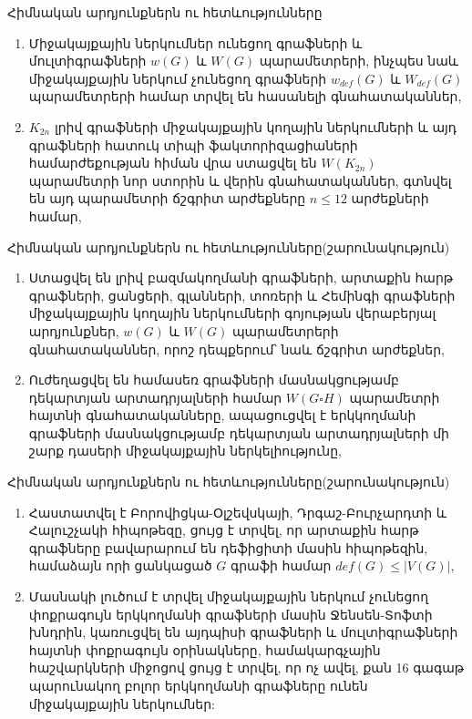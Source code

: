 \begin{frame}{Հիմնական արդյունքներն ու հետևությունները}
\begin{enumerate}
\justifying
    \item Միջակայքային ներկումներ ունեցող գրաֆների և մուլտիգրաֆների $w(G)$ և $W(G)$ պարամետրերի, ինչպես նաև միջակայքային ներկում չունեցող գրաֆների $w_{def}(G)$ և $W_{def}(G)$ պարամետրերի համար տրվել են հասանելի գնահատականներ,
    
    \item $K_{2n}$ լրիվ գրաֆների միջակայքային կողային ներկումների և այդ գրաֆների հատուկ տիպի ֆակտորիզացիաների համարժեքության հիման վրա ստացվել են  $W(K_{2n})$ պարամետրի նոր ստորին և վերին գնահատականներ, գտնվել են այդ պարամետրի ճշգրիտ արժեքները $n \leq 12$ արժեքների համար,
    \seti
\end{enumerate}
\end{frame}

\begin{frame}{Հիմնական արդյունքներն ու հետևությունները}{(շարունակություն)}
\begin{enumerate}
    \justifying
    \conti
    \item Ստացվել են լրիվ բազմակողմանի գրաֆների, արտաքին հարթ գրաֆների, ցանցերի, գլանների, տոռերի և Հեմինգի գրաֆների միջակայքային կողային ներկումների գոյության վերաբերյալ արդյունքներ, $w(G)$ և $W(G)$ պարամետրերի գնահատականներ, որոշ դեպքերում՝ նաև ճշգրիտ արժեքներ,

    \item %
    Ուժեղացվել են համասեռ գրաֆների մասնակցությամբ դեկարտյան արտադրյալների համար $W(G \square H)$ պարամետրի հայտնի գնահատականները, ապացուցվել է երկկողմանի գրաֆների մասնակցությամբ դեկարտյան արտադրյալների մի շարք դասերի միջակայքային ներկելիությունը,
    
    \seti
\end{enumerate}
\end{frame}

\begin{frame}{Հիմնական արդյունքներն ու հետևությունները}{(շարունակություն)}
\begin{enumerate}
    \justifying
    \conti
    \item %
    Հաստատվել է Բորովիցկա-Օլշեվսկայի, Դրգաշ-Բուրչարդտի և Հալուշչակի հիպոթեզը, ցույց է տրվել, որ արտաքին հարթ գրաֆները բավարարում են դեֆիցիտի մասին հիպոթեզին, համաձայն որի ցանկացած $G$ գրաֆի համար $def(G) \leq |V(G)|$,

    \item Մասնակի լուծում է տրվել միջակայքային ներկում չունեցող փոքրագույն երկկողմանի գրաֆների մասին Ջենսեն-Տոֆտի խնդրին, կառուցվել են այդպիսի գրաֆների և մուլտիգրաֆների հայտնի փոքրագույն օրինակները, համակարգչային հաշվարկների միջոցով ցույց է տրվել, որ ոչ ավել, քան 16 գագաթ պարունակող բոլոր երկկողմանի գրաֆները ունեն միջակայքային ներկումներ:
    
    \seti
\end{enumerate}
\end{frame}
